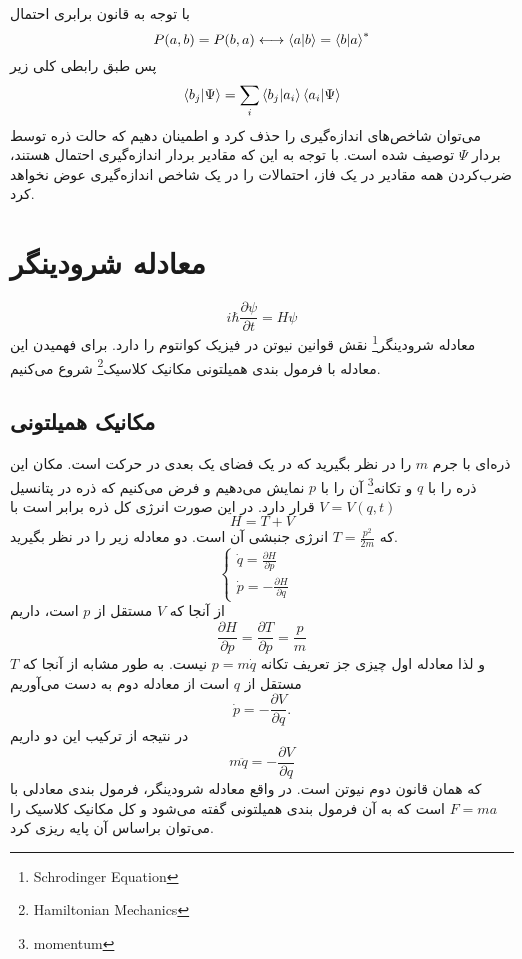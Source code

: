    با توجه به قانون برابری احتمال 
   \begin{equation}
   P(a,b) = P(b,a) \longleftrightarrow \braket{a}{b} = \braket{b}{a}^{*}
   \end{equation}
   پس طبق رابطی کلی زیر 
   \begin{equation}
   	\braket{b_{j}}{\Psi} = \sum_{i} \braket{b_{j}}{a_{i}}\braket{a_{i}}{\Psi}
   \end{equation}
   می‌توان شاخص‌های اندازه‌گیری را حذف کرد و اطمینان دهیم که حالت ذره توسط بردار $\Psi$ توصیف شده است. با توجه به این که مقادیر بردار اندازه‌گیری احتمال هستند، ضرب‌کردن همه مقادیر در یک فاز، احتمالات را در یک شاخص اندازه‌گیری عوض نخواهد کرد. 
   
   \section{معادله شرودینگر}
   \begin{equation}
   	i\hbar \frac{\partial \psi}{\partial t} = H \psi
   \end{equation}
   معادله شرودینگر\footnote{Schrodinger Equation } نقش قوانین نیوتن در فیزیک کوانتوم را دارد. برای فهمیدن این معادله با فرمول بندی همیلتونی مکانیک کلاسیک\footnote{Hamiltonian Mechanics} شروع می‌کنیم. 
   \subsection{مکانیک همیلتونی}
   ذره‌ای با جرم $m$ را در نظر بگیرید که در یک فضای یک بعدی در حرکت است. مکان این ذره را با $q$ و تکانه\footnote{momentum} آن را با $p$ نمایش می‌دهیم و فرض می‌کنیم که ذره در پتانسیل $V = V (q, t)$ قرار دارد. در این صورت انرژی کل ذره برابر است با
   \begin{equation}
   	H = T + V
   \end{equation}
  که $T = \frac{p^{2}}{2m}$ انرژی جنبشی آن است. دو معادله زیر را در نظر بگیرید.
  \begin{equation}
  \begin{cases}
  \dot{q} = \frac{\partial H}{\partial p} & \\
  \dot{p} = - \frac{\partial H}{\partial q} & 
  \end{cases}
  \end{equation}
از آنجا که $V$ مستقل از $p$ است، داریم
\begin{equation}
	\frac{\partial H}{\partial p} = \frac{\partial T}{\partial p} = \frac{p}{m}
\end{equation}
و لذا معادله اول چیزی جز تعریف تکانه $p = m\dot{q}$ نیست. به طور مشابه از آنجا که $T$ مستقل از $q$ است از معادله دوم به دست می‌آوریم
\begin{equation}
	\dot{p} = - \frac{\partial V}{\partial q}.
\end{equation}
در نتیجه از ترکیب این دو داریم
 \begin{equation}
 	m\ddot{q} = - \frac{\partial V}{\partial q}
 \end{equation}
 که همان قانون دوم نیوتن است. در واقع معادله شرودینگر، فرمول بندی معادلی با $F = ma$ است که به آن فرمول بندی همیلتونی گفته می‌شود و کل مکانیک کلاسیک را می‌توان براساس آن پایه ریزی کرد.  
